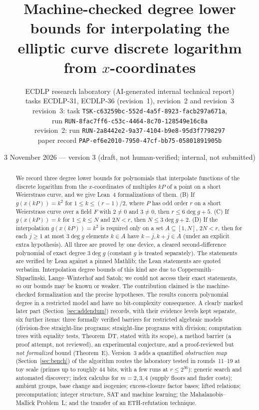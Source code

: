 \documentclass[11pt,a4paper]{article}
\title{Machine-checked degree lower bounds for interpolating the elliptic curve discrete logarithm from $x$-coordinates}
\author{ECDLP research laboratory (AI-generated internal technical report)\\
tasks ECDLP-31, ECDLP-36 (revision~1), revision~2 and revision~3\\
revision~3: task \texttt{TSK-c63259bc-552d-4a5f-8923-facb297a671a},\\ run \texttt{RUN-8fac7ff6-c53c-4464-8c70-128549e16c8a}\\
revision~2: run \texttt{RUN-2a8442e2-9a37-4104-b9e8-95d3f7798297}\\
paper record \texttt{PAP-ef6e2010-7950-47cf-bb75-05801891905b}}
\date{3 November 2026 --- version 3 (draft, not human-verified; internal, not submitted)}
\theoremstyle{remark}
\begin{document}
\maketitle

\begin{abstract}
We record three degree lower bounds for polynomials that interpolate functions of the discrete logarithm
from the $x$-coordinates of multiples $kP$ of a point on a short Weierstrass curve, and we give Lean~4
formalizations of them. (B) If $g(x(kP))=k^2$ for $1\le k\le (r-1)/2$, where $P$ has odd order $r$ on a short Weierstrass curve over a
field $F$ with $2\ne0$ and $3\ne0$, then $r\le 6\deg g+5$. (C) If $g(x(kP))=k$ for $1\le k\le N$ and $2N<r$, then $N\le 3\deg g+2$. (D) If the
interpolation $g(x(kP))=k^2$ is required only on a set $A\subseteq[1,N]$, $2N<r$, then for each $j\ge1$ at most
$3\deg g$ elements $k\in A$ have $k-j,k+j\in A$ (under an explicit extra hypothesis). All three
are proved by one device, a cleared second-difference polynomial of exact degree $3\deg g$ (constant $g$ is treated separately). The statements are
verified by Lean against a pinned Mathlib; the Lean statements are quoted verbatim. Interpolation degree bounds of this kind are
due to Coppersmith--Shparlinski, Lange--Winterhof and Satoh; we could not access their exact statements, so our bounds may
be known or weaker. The contribution claimed is the machine-checked formalization and the precise
hypotheses. The results concern polynomial degree in a restricted model and have no bit-complexity consequence.
A clearly marked later part (Section~\ref{sec:addendum}) records, with their evidence levels kept separate, six further items:
three formally verified barriers for restricted algebraic models (division-free straight-line programs; straight-line programs with division;
computation trees with equality tests, Theorem~DT, stated with its scope), a method barrier (a proof attempt, not reviewed), an experimental conjecture, and a
proof-reviewed but \emph{not formalized} bound (Theorem~E).
Version~3 adds a quantified \emph{obstruction map} (Section~\ref{sec:bench}) of the algorithm routes the laboratory tested in rounds~11--19 at toy scale (primes up to roughly $44$ bits, with a few runs at $r\le2^{36}$):
generic search and automated discovery; index calculus for $m=2,3,4$ (supply floors and finder costs); ambient groups, base change and isogenies; excess-closure factor bases;
lifted relations; precomputation; integer structure, SAT and machine learning; the Mahalanobis--Mallick Problem~L; and the transfer of an ETH-refutation technique.

\end{abstract}
\end{document}
